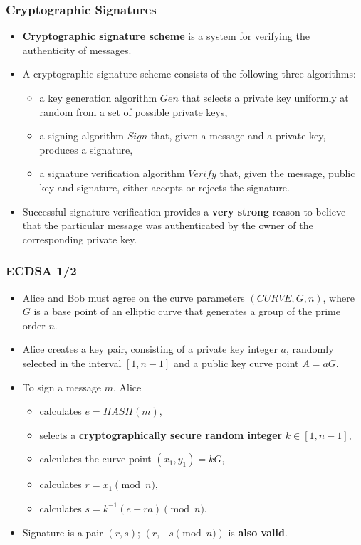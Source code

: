 \documentclass{beamer}
\begin{document}
\begin{frame}
  \frametitle{Cryptographic Signatures}
  \begin{itemize}
  \item \textbf{Cryptographic signature scheme} is a system for verifying the
    authenticity of messages.
  \item A cryptographic signature scheme consists of the following three
    algorithms:
    \begin{itemize}
    \item a key generation algorithm $Gen$ that selects a private key uniformly
      at random from a set of possible private keys,
    \item a signing algorithm $Sign$ that, given a message and a private key,
      produces a signature,
    \item a signature verification algorithm $Verify$ that, given the message,
      public key and signature, either accepts or rejects the signature.
    \end{itemize}
  \item Successful signature verification provides a \textbf{very strong} reason
    to believe that the particular message was authenticated by the owner of the
    corresponding private key.
  \end{itemize}
\end{frame}

\begin{frame}
  \frametitle{ECDSA 1/2}
  \begin{itemize}
  \item Alice and Bob must agree on the curve parameters $(CURVE, G, n)$, where
    $G$ is a base point of an elliptic curve that generates a group of the prime
    order $n$.
  \item Alice creates a key pair, consisting of a private key integer $a$,
    randomly selected in the interval $[1, n - 1]$ and a public key curve point
    $A = aG$.
  \item To sign a message $m$, Alice
    \begin{itemize}
    \item calculates $e = HASH(m)$,
    \item selects a \textbf{cryptographically secure random integer}
      $k \in [1, n - 1]$,
    \item calculates the curve point $(x_1, y_1) = kG$,
    \item calculates $r = x_1 \pmod{n}$,
    \item calculates $s = k^{-1}(e + ra) \pmod{n}$.
    \end{itemize}
  \item Signature is a pair $(r, s)$; $(r, -s \pmod{n})$ is \textbf{also valid}.
  \end{itemize}
\end{frame}
\end{document}
